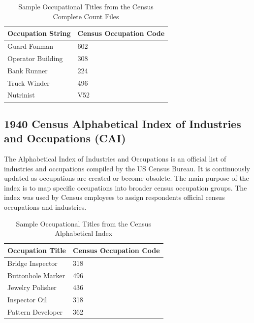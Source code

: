\documentclass[12pt]{article}
\begin{document}
  \begin{table}[h!]
    \centering
    \caption{Sample Occupational Titles from the Census Complete Count Files}
    \begin{tabular}{|l|l|}
      \hline
      \textbf{Occupation String} & \textbf{Census Occupation Code} \\ \hline
      Guard Fonman               & 602                             \\ \hline
      Operator Building          & 308                             \\ \hline
      Bank Runner                & 224                             \\ \hline
      Truck Winder               & 496                             \\ \hline
      Nutrinist                  & V52                             \\ \hline
    \end{tabular}
  \end{table}
  \FloatBarrier

  \subsection{1940 Census Alphabetical Index of Industries and Occupations (CAI)}
  The Alphabetical Index of Industries and Occupations is an official list of industries and occupations compiled by the US Census Bureau. It is continuously updated as occupations are created or become obsolete. The main purpose of the index is to map specific occupations into broader census occupation groups. The index was used by Census employees to assign respondents official census occupations and industries.

  \begin{table}[h!]
    \centering
    \caption{Sample Occupational Titles from the Census Alphabetical Index}
    \begin{tabular}{|l|l|}
      \hline
      \textbf{Occupation Title} & \textbf{Census Occupation Code} \\ \hline
      Bridge Inspector               & 318                        \\ \hline
      Buttonhole Marker          & 496                             \\ \hline
      Jewelry Polisher              & 436                        \\ \hline
      Inspector Oil               & 318                             \\ \hline
      Pattern Developer                  & 362                             \\ \hline
    \end{tabular}
  \end{table}
  \FloatBarrier
\end{document}
